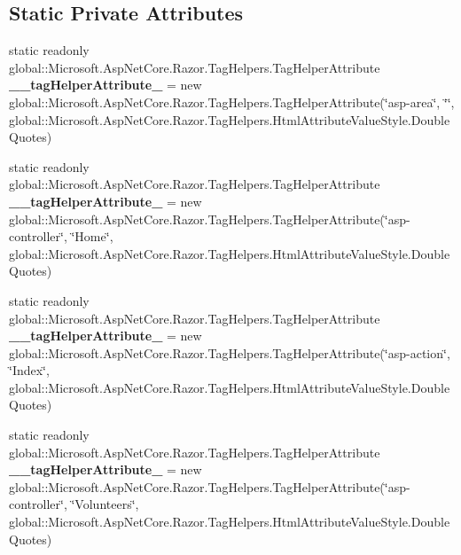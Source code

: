 \subsection*{Static Private Attributes}
\begin{DoxyCompactItemize}
\item 
\mbox{\label{class_asp_net_core_1_1_views___shared____sidebar_a9bed9c7165fd8e90315156e673303ab5}} 
static readonly global\+::\+Microsoft.\+Asp\+Net\+Core.\+Razor.\+Tag\+Helpers.\+Tag\+Helper\+Attribute {\bfseries \+\_\+\+\_\+tag\+Helper\+Attribute\+\_} = new global\+::\+Microsoft.\+Asp\+Net\+Core.\+Razor.\+Tag\+Helpers.\+Tag\+Helper\+Attribute(\char`\"{}asp-\/area\char`\"{}, \char`\"{}\char`\"{}, global\+::\+Microsoft.\+Asp\+Net\+Core.\+Razor.\+Tag\+Helpers.\+Html\+Attribute\+Value\+Style.\+Double\+Quotes)
\item 
\mbox{\label{class_asp_net_core_1_1_views___shared____sidebar_af03320d911eaee31538f4d2f1580218f}} 
static readonly global\+::\+Microsoft.\+Asp\+Net\+Core.\+Razor.\+Tag\+Helpers.\+Tag\+Helper\+Attribute {\bfseries \+\_\+\+\_\+tag\+Helper\+Attribute\+\_} = new global\+::\+Microsoft.\+Asp\+Net\+Core.\+Razor.\+Tag\+Helpers.\+Tag\+Helper\+Attribute(\char`\"{}asp-\/controller\char`\"{}, \char`\"{}Home\char`\"{}, global\+::\+Microsoft.\+Asp\+Net\+Core.\+Razor.\+Tag\+Helpers.\+Html\+Attribute\+Value\+Style.\+Double\+Quotes)
\item 
\mbox{\label{class_asp_net_core_1_1_views___shared____sidebar_a787907074d6add66ea14ec6f240a14ec}} 
static readonly global\+::\+Microsoft.\+Asp\+Net\+Core.\+Razor.\+Tag\+Helpers.\+Tag\+Helper\+Attribute {\bfseries \+\_\+\+\_\+tag\+Helper\+Attribute\+\_} = new global\+::\+Microsoft.\+Asp\+Net\+Core.\+Razor.\+Tag\+Helpers.\+Tag\+Helper\+Attribute(\char`\"{}asp-\/action\char`\"{}, \char`\"{}Index\char`\"{}, global\+::\+Microsoft.\+Asp\+Net\+Core.\+Razor.\+Tag\+Helpers.\+Html\+Attribute\+Value\+Style.\+Double\+Quotes)
\item 
\mbox{\label{class_asp_net_core_1_1_views___shared____sidebar_a99d3c55300a19bf04ec99651563fe759}} 
static readonly global\+::\+Microsoft.\+Asp\+Net\+Core.\+Razor.\+Tag\+Helpers.\+Tag\+Helper\+Attribute {\bfseries \+\_\+\+\_\+tag\+Helper\+Attribute\+\_} = new global\+::\+Microsoft.\+Asp\+Net\+Core.\+Razor.\+Tag\+Helpers.\+Tag\+Helper\+Attribute(\char`\"{}asp-\/controller\char`\"{}, \char`\"{}Volunteers\char`\"{}, global\+::\+Microsoft.\+Asp\+Net\+Core.\+Razor.\+Tag\+Helpers.\+Html\+Attribute\+Value\+Style.\+Double\+Quotes)

\end{DoxyCompactItemize}

